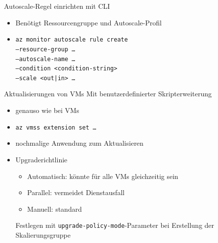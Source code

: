 \begin{flashcard}[Definition]{Autoscale-Regel einrichten mit CLI}
    \begin{itemize}
        \item Benötigt Ressourcengruppe und Autoscale-Profil
        \item \texttt{az monitor autoscale rule create\\--resource-group \ldots\\--autoscale-name \ldots\\--condition <condition-string>\\--scale <out|in> \ldots}
    \end{itemize}
\end{flashcard}

\begin{flashcard}[Definition]{Aktualisierungen von VMs}
    Mit benutzerdefinierter Skripterweiterung
    \begin{itemize}
        \item genauso wie bei VMs
        \item \texttt{az vmss extension set \ldots}
        \item nochmalige Anwendung zum Aktualisieren
        \item Upgraderichtlinie
            \begin{itemize}
                \item Automatisch: könnte für alle VMs gleichzeitig sein
                \item Parallel: vermeidet Dienstausfall
                \item Manuell: standard
            \end{itemize}
            Festlegen mit \texttt{upgrade-policy-mode}-Parameter bei Erstellung der Skalierungsgruppe
    \end{itemize}
\end{flashcard}
   
